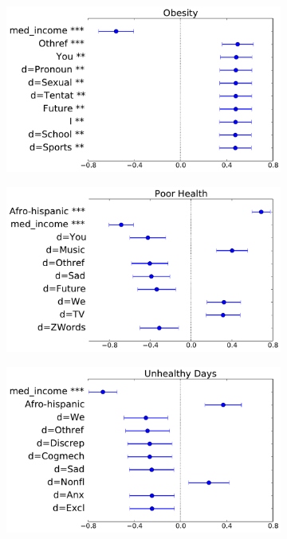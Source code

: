 \begin{figure}
\begin{subfigure}[b]{0.33\textwidth}
\label{fig.lowbirthweight}
\end{subfigure}
\begin{subfigure}[b]{0.33\textwidth}
\centering
\includegraphics[width=\columnwidth,height=.6\columnwidth]{figs/obese}
\label{fig.obese}
\end{subfigure}
\begin{subfigure}[b]{0.33\textwidth}
\centering
\includegraphics[width=\columnwidth,height=.6\columnwidth]{figs/fairpoorhealth}
\label{fig.fairpoorhealth}
\end{subfigure}
\begin{subfigure}[b]{0.33\textwidth}
\centering
\includegraphics[width=\columnwidth,height=.6\columnwidth]{figs/physicallyunhealthydays}

\end{subfigure}
\end{figure}
